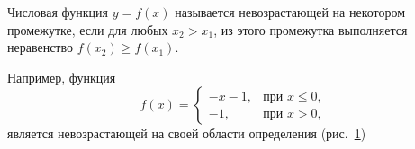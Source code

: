 \begin{Def}
Числовая функция $y = f(x)$ называется невозрастающей на некотором
промежутке, если для любых $x_{2} > x_{1}$, из этого промежутка
выполняется неравенство $f(x_{2}) \geqslant f(x_{1})$.
\end{Def}

Например, функция
\begin{equation*}
f(x) = 
\begin{cases}
-x - 1, & \text{при $x \leqslant 0$}, \\
-1, & \text{при $x > 0$},
\end{cases}
\end{equation*}
является невозрастающей на своей области определения (рис.\ \ref{fig_1_6_14})

\begin{figure}\label{fig_1_6_14}
\end{figure}

